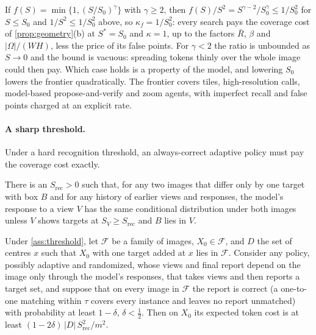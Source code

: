 If $f(S) = \min\{1, (S/S_0)^\gamma\}$ with $\gamma \ge 2$, then $f(S)/S^2 = S^{\gamma-2}/S_0^\gamma \le 1/S_0^2$ for $S \le S_0$ and $1/S^2 \le 1/S_0^2$ above, so $\kappa_f = 1/S_0^2$: every search pays the coverage cost of \cref{prop:geometry}(b) at $S^\ast = S_0$ and $\kappa = 1$, up to the factors $\bar R$, $\beta$ and $|\Omega|/(WH)$, less the price of its false points. For $\gamma < 2$ the ratio is unbounded as $S \to 0$ and the bound is vacuous: spreading tokens thinly over the whole image could then pay. Which case holds is a property of the model, and lowering $S_0$ lowers the frontier quadratically. The frontier covers tiles, high-resolution calls, model-based propose-and-verify and zoom agents, with imperfect recall and false points charged at an explicit rate.

\paragraph{A sharp threshold.} Under a hard recognition threshold, an always-correct adaptive policy must pay the coverage cost exactly.

\begin{assumption}
\label{ass:threshold}
There is an $S_{\mathrm{rec}} > 0$ such that, for any two images that differ only by one target with box $B$ and for any history of earlier views and responses, the model's response to a view $V$ has the same conditional distribution under both images unless $V$ shows targets at $S_V \ge S_{\mathrm{rec}}$ and $B$ lies in $V$.
\end{assumption}

\begin{proposition}
\label{prop:adaptive}
Under \cref{ass:threshold}, let $\mathcal{F}$ be a family of images, $X_0 \in \mathcal{F}$, and $D$ the set of centres $x$ such that $X_0$ with one target added at $x$ lies in $\mathcal{F}$. Consider any policy, possibly adaptive and randomized, whose views and final report depend on the image only through the model's responses, that takes views and then reports a target set, and suppose that on every image in $\mathcal{F}$ the report is correct (a one-to-one matching within $\tau$ covers every instance and leaves no report unmatched) with probability at least $1-\delta$, $\delta < \tfrac12$. Then on $X_0$ its expected token cost is at least $(1-2\delta)\,|D|\,S_{\mathrm{rec}}^2/m^2$.
\end{proposition}

